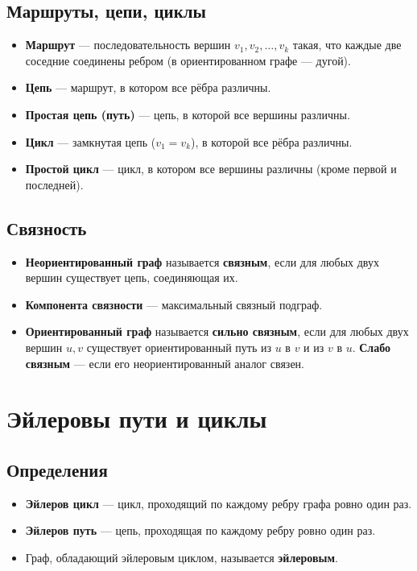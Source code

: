 \documentclass[12pt]{article}
\begin{document}
\begin{enumerate}
\subsection{Маршруты, цепи, циклы}
\begin{itemize}
    \item \textbf{Маршрут} — последовательность вершин \(v_1, v_2, \dots, v_k\) такая, что каждые две соседние соединены ребром (в ориентированном графе — дугой).
    \item \textbf{Цепь} — маршрут, в котором все рёбра различны.
    \item \textbf{Простая цепь (путь)} — цепь, в которой все вершины различны.
    \item \textbf{Цикл} — замкнутая цепь (\(v_1 = v_k\)), в которой все рёбра различны.
    \item \textbf{Простой цикл} — цикл, в котором все вершины различны (кроме первой и последней).
\end{itemize}

\subsection{Связность}
\begin{itemize}
    \item \textbf{Неориентированный граф} называется \textbf{связным}, если для любых двух вершин существует цепь, соединяющая их.
    \item \textbf{Компонента связности} — максимальный связный подграф.
    \item \textbf{Ориентированный граф} называется \textbf{сильно связным}, если для любых двух вершин \(u,v\) существует ориентированный путь из \(u\) в \(v\) и из \(v\) в \(u\). \textbf{Слабо связным} — если его неориентированный аналог связен.
\end{itemize}

\section{Эйлеровы пути и циклы}
\subsection{Определения}
\begin{itemize}
    \item \textbf{Эйлеров цикл} — цикл, проходящий по каждому ребру графа ровно один раз.
    \item \textbf{Эйлеров путь} — цепь, проходящая по каждому ребру ровно один раз.
    \item Граф, обладающий эйлеровым циклом, называется \textbf{эйлеровым}.
\end{itemize}


\end{enumerate}
\end{document}
